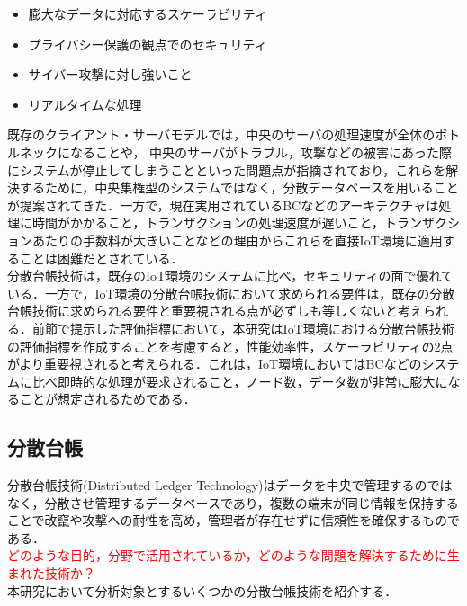 \documentclass{kuisthesis}			%
\begin{document}
\begin{itemize}
\setlength{\itemsep}{0cm}
\item 膨大なデータに対応するスケーラビリティ
\item プライバシー保護の観点でのセキュリティ
\item サイバー攻撃に対し強いこと
\item リアルタイムな処理
\end{itemize}

既存のクライアント・サーバモデルでは，中央のサーバの処理速度が全体のボトルネックになることや，
中央のサーバがトラブル，攻撃などの被害にあった際にシステムが停止してしまうことといった問題点が指摘されており，これらを解決するために，中央集権型のシステムではなく，分散データベースを用いることが提案されてきた．一方で，現在実用されているBCなどのアーキテクチャは処理に時間がかかること，トランザクションの処理速度が遅いこと，トランザクションあたりの手数料が大きいことなどの理由からこれらを直接IoT環境に適用することは困難だとされている．\\
分散台帳技術は，既存のIoT環境のシステムに比べ，セキュリティの面で優れている．一方で，IoT環境の分散台帳技術において求められる要件は，既存の分散台帳技術に求められる要件と重要視される点が必ずしも等しくないと考えられる．前節で提示した評価指標において，本研究はIoT環境における分散台帳技術の評価指標を作成することを考慮すると，性能効率性，スケーラビリティの2点がより重要視されると考えられる．これは，IoT環境においてはBCなどのシステムに比べ即時的な処理が要求されること，ノード数，データ数が非常に膨大になることが想定されるためである．\\

\subsection{分散台帳}
分散台帳技術(Distributed Ledger Technology)はデータを中央で管理するのではなく，分散させ管理するデータベースであり，複数の端末が同じ情報を保持することで改竄や攻撃への耐性を高め，管理者が存在せずに信頼性を確保するものである．\\
\textcolor{red}{どのような目的，分野で活用されているか，どのような問題を解決するために生まれた技術か？}\\
本研究において分析対象とするいくつかの分散台帳技術を紹介する．
\end{document}

